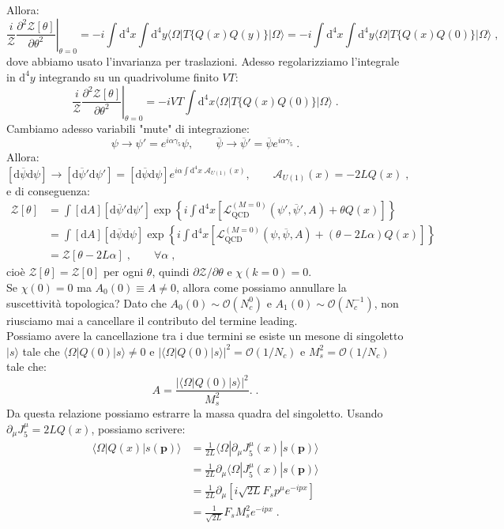 \documentclass[12pt,a4paper]{article}
\theoremstyle{definition}
\newcommand{\pdev}[3][]{\frac{\partial^{#1} #2}{\partial #3^{#1}}}
\newcommand{\lag}{\mathcal{L}}
\newcommand{\diff}[1][]{\mathrm{d}#1}
\newcommand{\bra}{\langle}
\newcommand{\ket}{\rangle}
\newcommand{\zpart}{\mathcal{Z}}
\numberwithin{equation}{section}
\begin{document}
Allora:
$$
\frac{i}{\zpart}\left.\pdev[2]{\zpart[\theta]}{\theta}\right|_{\theta=0}=-i\int\diff^4{x}\int\diff^4{y}\bra\Omega|T\{Q(x)Q(y)\}|\Omega\ket=-i\int\diff^4{x}\int\diff^4{y}\bra\Omega|T\{Q(x)Q(0)\}|\Omega\ket\;,
$$
dove abbiamo usato l'invarianza per traslazioni. Adesso regolarizziamo l'integrale in $\diff^4{y}$ integrando su un quadrivolume finito $VT$:
$$
\frac{i}{\zpart}\left.\pdev[2]{\zpart[\theta]}{\theta}\right|_{\theta=0}=-iVT\int\diff^4{x}\bra\Omega|T\{Q(x)Q(0)\}|\Omega\ket\;.
$$
Cambiamo adesso variabili "mute" di integrazione:
$$
\psi\to\psi'=e^{i\alpha\gamma_5}\psi,\qquad\overline{\psi}\to\overline{\psi}'=\overline{\psi}e^{i\alpha\gamma_5}\;.
$$
Allora:
$$
[\diff{\overline{\psi}}\diff{\psi}]\to[\diff{\overline{\psi}}'\diff{\psi}']=[\diff{\overline{\psi}}\diff{\psi}]e^{i\alpha\int\diff^4{x}\;\mathcal{A}_{U(1)}(x)}, \qquad \mathcal{A}_{U(1)}(x)=-2LQ(x)\;,
$$
e di conseguenza:
\begin{align*}
\zpart[\theta] &=\int[\diff{A}][\diff{\overline{\psi}}'\diff{\psi}']\exp\left\{i\int\diff^4{x}\left[\lag_{\mathrm{QCD}}^{(M=0)}(\psi',\overline{\psi}',A)+\theta Q(x)\right]\right\} \\
&=\int[\diff{A}][\diff{\overline{\psi}}\diff{\psi}]\exp\left\{i\int\diff^4{x}\left[\lag_{\mathrm{QCD}}^{(M=0)}(\psi,\overline{\psi},A)+(\theta-2L\alpha)Q(x)\right]\right\} \\
&=\zpart[\theta-2L\alpha]\;,\qquad \forall\alpha\;,
\end{align*}
cioè $\zpart[\theta]=\zpart[0]$ per ogni $\theta$, quindi $\partial\zpart/\partial\theta$ e $\chi(k=0)=0$. \\
Se $\chi(0)=0$ ma $A_0(0)\equiv A\ne 0$, allora come possiamo annullare la suscettività topologica? Dato che $A_0(0)\sim \mathcal{O}(N_c^0)$ e $A_1(0)\sim \mathcal{O}(N_c^{-1})$, non riusciamo mai a cancellare il contributo del termine leading. \\
Possiamo avere la cancellazione tra i due termini se esiste un mesone di singoletto $|s\ket$ tale che $\bra\Omega|Q(0)|s\ket\ne0$ e $|\bra\Omega|Q(0)|s\ket|^2=\mathcal{O}(1/N_c)$ e $M_s^2=\mathcal{O}(1/N_c)$ tale che:
\begin{equation}
\boxed{
A=\frac{|\bra\Omega|Q(0)|s\ket|^2}{M_s^2}. \label{ch19_singoletto}
}\;.
\end{equation}
Da questa relazione possiamo estrarre la massa quadra del singoletto. Usando $\partial_{\mu}J^{\mu}_5=2LQ(x)$, possiamo scrivere:
\begin{align*}
\bra\Omega|Q(x)|s(\mathbf{p})\ket &= \frac{1}{2L}\bra\Omega|\partial_{\mu}J^{\mu}_5(x)|s(\mathbf{p})\ket \\
&=\frac{1}{2L}\partial_{\mu}\bra\Omega|J^{\mu}_5(x)|s(\mathbf{p})\ket \\
&=\frac{1}{2L}\partial_{\mu}[i\sqrt{2L}F_sp^{\mu}e^{-ipx}] \\
&=\frac{1}{\sqrt{2L}}F_sM_s^2e^{-ipx}\;.
\end{align*}
\end{document}
